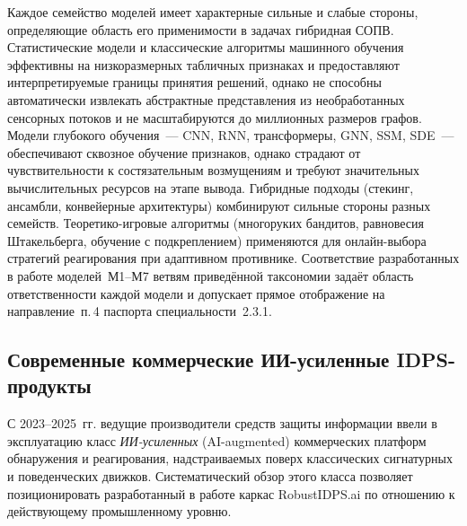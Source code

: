 Каждое семейство моделей имеет характерные сильные и слабые стороны,
определяющие область его применимости в задачах гибридная СОПВ.
Статистические модели и классические алгоритмы машинного обучения
эффективны на низкоразмерных табличных признаках и предоставляют
интерпретируемые границы принятия решений, однако не способны
автоматически извлекать абстрактные представления из необработанных
сенсорных потоков и не масштабируются до миллионных размеров
графов. Модели глубокого обучения~--- CNN, RNN, трансформеры, GNN,
SSM, SDE~--- обеспечивают сквозное обучение признаков, однако
страдают от чувствительности к состязательным возмущениям и
требуют значительных вычислительных ресурсов на этапе вывода.
Гибридные подходы (стекинг, ансамбли, конвейерные архитектуры)
комбинируют сильные стороны разных семейств. Теоретико-игровые
алгоритмы (многоруких бандитов, равновесия Штакельберга, обучение с
подкреплением) применяются для онлайн-выбора стратегий реагирования
при адаптивном противнике. Соответствие разработанных в работе
моделей~М1--М7 ветвям приведённой таксономии задаёт область
ответственности каждой модели и допускает прямое отображение на
направление~п.\,4 паспорта специальности~2.3.1.

\subsection{Современные коммерческие ИИ-усиленные IDPS-продукты}
\label{subsec:commercial_ai_idps}

С 2023--2025~гг. ведущие производители средств защиты информации
ввели в эксплуатацию класс \emph{ИИ-усиленных} (AI-augmented)
коммерческих платформ обнаружения и реагирования, надстраиваемых
поверх классических сигнатурных и поведенческих движков.
Систематический обзор этого класса позволяет позиционировать
разработанный в работе каркас RobustIDPS.ai по отношению к
действующему промышленному уровню.

